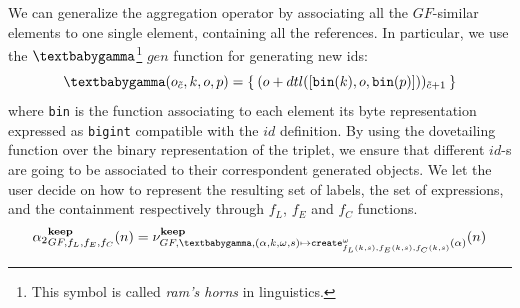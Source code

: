We can generalize the aggregation operator by associating all the $GF$-similar elements to one single element, containing all the references. In particular, we use the $\genp$\footnote{This symbol is called \textit{ram's horns} in linguistics.} $gen$ function for generating new ids:
\[\genp(o_{\tilde{c}},k,o,p)=\Set{(o+dtl([\texttt{bin}(k),o,\texttt{bin}(p)]))_{\tilde{c}+1}}\] where \texttt{bin} is the function associating to each element its byte representation expressed as \texttt{bigint} compatible with the $id$ definition. By using the dovetailing function over the binary representation of the triplet, we ensure that different $id$-s are going to be associated to their correspondent generated objects.
We let the user decide on how to represent the resulting set of labels, the set of expressions, and the containment respectively through $f_L$, $f_E$ and $f_C$ functions. 
\[{\alpha_2}_{GF,f_L,f_E,f_C}^{\textbf{keep}}(n)=\nu^{\textbf{keep}}_{GF,\genp,(\alpha,k,\omega,s)\mapsto \texttt{create}^\omega_{f_L(k,s),f_E(k,s),f_C(k, s)}(\alpha)}(n)\]



